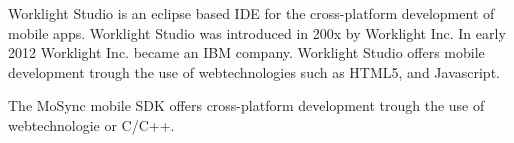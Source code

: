 Worklight Studio is an eclipse based IDE for the cross-platform development of mobile apps. Worklight Studio was introduced in 200x by Worklight Inc. In early 2012 Worklight Inc. became an IBM company. Worklight Studio offers mobile development trough the use of webtechnologies such as HTML5, and Javascript.

The MoSync mobile SDK offers cross-platform development trough the use of webtechnologie or C/C++.

















